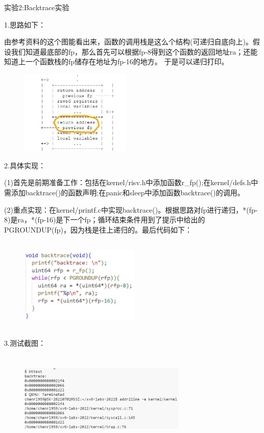 \documentclass[12pt]{article}
\begin{document}
\begin{Large}
	\noindent 实验2:Backtrace实验\\
\end{Large}
1.思路如下：\par
由参考资料的这个图能看出来，函数的调用栈是这么个结构(可递归自底向上)。假设我们知道最底部的fp，那么首先可以根据fp-8得到这个函数的返回地址ra；还能知道上一个函数栈的fp储存在地址为fp-16的地方。
于是可以递归打印。
\begin{figure}[H]
    \centering
    \includegraphics[height=4cm,width=5.3cm]{lab4-4.jpg}
\end{figure}
2.具体实现：\par
(1)首先是前期准备工作：包括在kernel/risv.h中添加函数r\_fp();在kernel/defs.h中需添加backtrace()的函数声明;在panic和sleep中添加函数backtrace()的调用。\par
(2)重点实现：在kernel/printf.c中实现backtrace()。根据思路对fp进行递归，*(fp-8)是ra，*(fp-16)是下一个fp；循环结束条件用到了提示中给出的PGROUNDUP(fp)，因为栈是往上递归的。最后代码如下：
\begin{figure}[H]
    \centering
    \includegraphics[height=4.5cm,width=5.7cm]{lab4-5.jpg}
\end{figure}
\newpage
\noindent 3.测试截图：
\begin{figure}[H]
    \centering
    \includegraphics[height=4.5cm,width=8cm]{lab4-6.jpg}
\end{figure}
\end{document}
